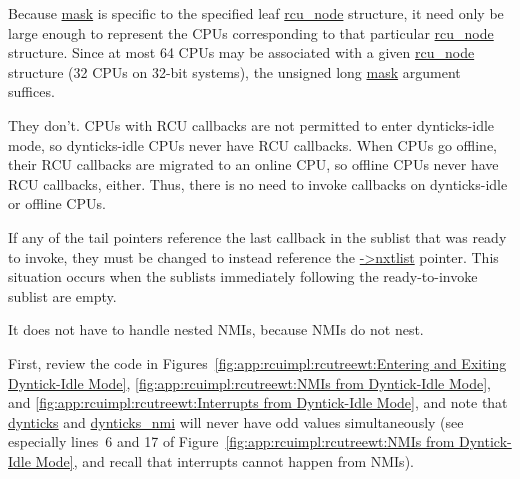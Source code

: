 
	Because \url{mask} is specific to the specified leaf \url{rcu_node}
	structure, it need only be large enough to represent the
	CPUs corresponding to that particular \url{rcu_node} structure.
	Since at most 64 CPUs may be associated with a given
	\url{rcu_node} structure (32 CPUs on 32-bit systems),
	the unsigned long \url{mask} argument suffices.


	They don't.
	CPUs with RCU callbacks are not permitted to enter dynticks-idle
	mode, so dynticks-idle CPUs never have RCU callbacks.
	When CPUs go offline, their RCU callbacks are migrated to
	an online CPU, so offline CPUs never have RCU callbacks, either.
	Thus, there is no need to invoke callbacks on dynticks-idle
	or offline CPUs.


	If any of the tail pointers reference the last callback
	in the sublist that was ready to invoke, they must be
	changed to instead reference the \url{->nxtlist} pointer.
	This situation occurs when the sublists
	immediately following the ready-to-invoke sublist are empty.


	It does not have to handle nested NMIs, because NMIs do not nest.


	First, review the code in
	Figures~\ref{fig:app:rcuimpl:rcutreewt:Entering and Exiting Dyntick-Idle Mode},
	\ref{fig:app:rcuimpl:rcutreewt:NMIs from Dyntick-Idle Mode}, and
	\ref{fig:app:rcuimpl:rcutreewt:Interrupts from Dyntick-Idle Mode},
	and note that \url{dynticks} and \url{dynticks_nmi} will never
	have odd values simultaneously (see especially lines~6 and 17 of
	Figure~\ref{fig:app:rcuimpl:rcutreewt:NMIs from Dyntick-Idle Mode},
	and recall that interrupts cannot happen from NMIs).

